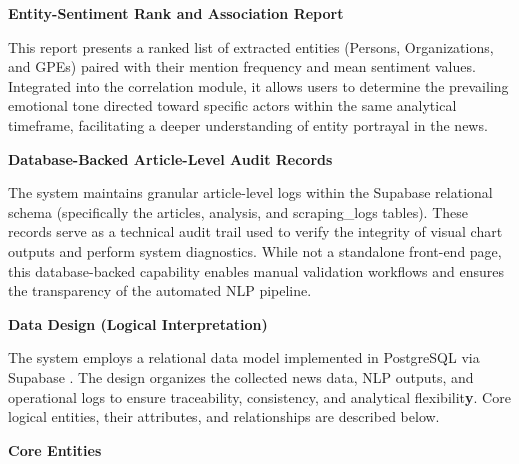 \textbf{Entity-Sentiment Rank and Association Report}

This report presents a ranked list of extracted entities (Persons, Organizations, and GPEs) \cite{ref26} paired with their mention frequency and mean sentiment values. Integrated into the correlation module, it allows users to determine the prevailing emotional tone directed toward specific actors within the same analytical timeframe, facilitating a deeper understanding of entity portrayal in the news.

\textbf{Database-Backed Article-Level Audit Records}

The system maintains granular article-level logs within the Supabase relational schema (specifically the articles, analysis, and scraping\_logs tables). These records serve as a technical audit trail used to verify the integrity of visual chart outputs and perform system diagnostics. While not a standalone front-end page, this database-backed capability enables manual validation workflows and ensures the transparency of the automated NLP pipeline.

\textbf{Data Design (Logical Interpretation)}

The system employs a relational data model implemented in PostgreSQL via Supabase \cite{ref06,ref19}. The design organizes the collected news data, NLP outputs, and operational logs to ensure traceability, consistency, and analytical flexibilit\textbf{y}. Core logical entities, their attributes, and relationships are described below.

\textbf{Core Entities}

